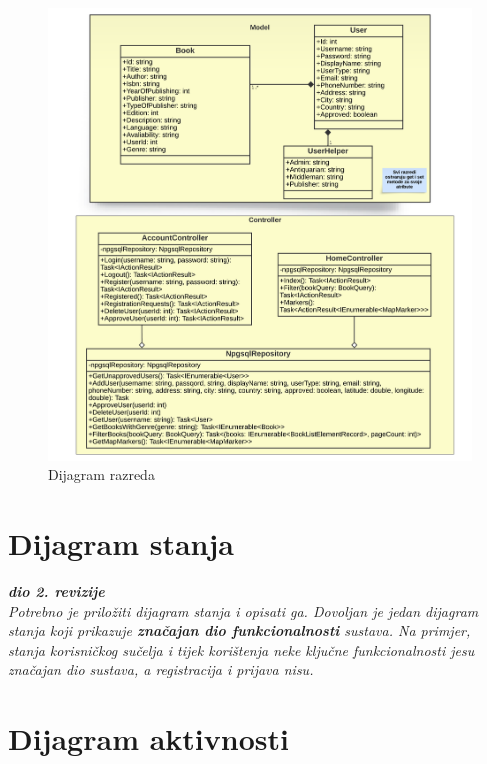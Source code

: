 			\begin{figure}[h]
				\centering
				\includegraphics[width = \textwidth]{slike/dijagramKlasa.PNG}
				\caption{Dijagram razreda}
				\label{fig:enter-label}
			\end{figure}
			
			\eject
		
		\section{Dijagram stanja}
			
			
			\textbf{\textit{dio 2. revizije}}\\
			
			\textit{Potrebno je priložiti dijagram stanja i opisati ga. Dovoljan je jedan dijagram stanja koji prikazuje \textbf{značajan dio funkcionalnosti} sustava. Na primjer, stanja korisničkog sučelja i tijek korištenja neke ključne funkcionalnosti jesu značajan dio sustava, a registracija i prijava nisu. }
			
			
			\eject 
			
		
		\section{Dijagram aktivnosti}
		
